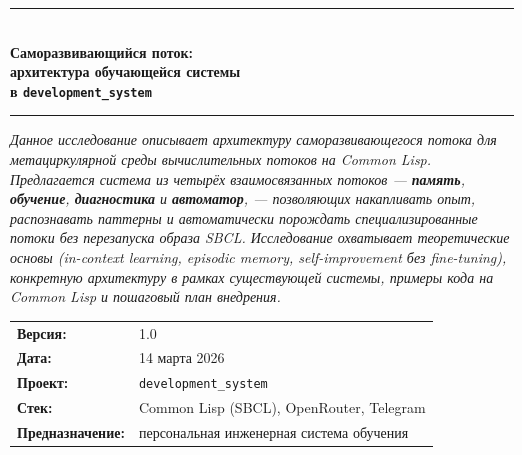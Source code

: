 \documentclass[12pt, a4paper, twoside]{article}
\begin{document}
\begin{titlepage}
  \color{DarkGray}

  \vspace*{10mm}

  {\color{AccentBlue}\rule{\textwidth}{1.5pt}}
  \vspace{6mm}

  {\sffamily\small\color{MidGray}{ТЕХНИЧЕСКОЕ ИССЛЕДОВАНИЕ}}\\[4mm]

  {\sffamily\LARGE\bfseries\color{AccentBlue}
    Саморазвивающийся поток:\\[4pt]
    архитектура обучающейся системы\\[4pt]
    в \texttt{development\_system}
  }

  \vspace{8mm}
  {\color{AccentBlue}\rule{\textwidth}{0.4pt}}
  \vspace{8mm}

  \begin{minipage}{0.92\textwidth}
    \itshape\color{DarkGray}
    Данное исследование описывает архитектуру саморазвивающегося потока
    для метациркулярной среды вычислительных потоков на Common Lisp.
    Предлагается система из четырёх взаимосвязанных потоков ---
    \textbf{память}, \textbf{обучение}, \textbf{диагностика} и \textbf{автоматор}, ---
    позволяющих накапливать опыт, распознавать паттерны и автоматически
    порождать специализированные потоки без перезапуска образа SBCL.
    Исследование охватывает теоретические основы (in-context learning,
    episodic memory, self-improvement без fine-tuning), конкретную архитектуру
    в рамках существующей системы, примеры кода на Common Lisp и пошаговый
    план внедрения.
  \end{minipage}

  \vspace{12mm}

  \begin{tabular}{ll}
    \textbf{Версия:}  & 1.0 \\[2pt]
    \textbf{Дата:}    & 14 марта 2026 \\[2pt]
    \textbf{Проект:}  & \texttt{development\_system} \\[2pt]
    \textbf{Стек:}    & Common Lisp (SBCL), OpenRouter, Telegram \\[2pt]
    \textbf{Предназначение:} & персональная инженерная система обучения \\
  \end{tabular}


\end{titlepage}
\end{document}

